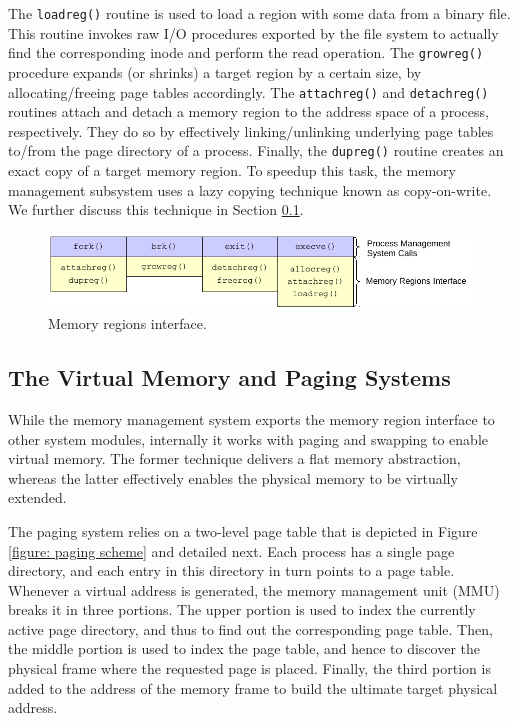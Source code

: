 \documentclass[10pt,a4paper]{article}
\begin{document}
The \texttt{loadreg()} routine is used to load a region with some data from a binary file. This routine invokes raw I/O procedures exported by the file system to actually find the corresponding inode and perform the read operation. The \texttt{growreg()} procedure expands (or shrinks) a target region by a certain size, by allocating/freeing page tables accordingly. The \texttt{attachreg()} and \texttt{detachreg()} routines attach and detach a memory region to the address space of a process, respectively. They do so by effectively linking/unlinking underlying page tables to/from the page directory of a process. Finally, the \texttt{dupreg()} routine creates an exact copy of a target memory region. To speedup this task, the memory management subsystem uses a lazy copying technique known as copy-on-write. We further discuss this technique in Section \ref{subsection: the virtual memory and paging systems}.

\begin{figure}[!t]
	\centering
	\includegraphics[scale=0.8]{img/memory-regions-interface}
	\caption{Memory regions interface.}
	\label{figure: memory regions interface}
\end{figure}

\subsection{The Virtual Memory and Paging Systems}
\label{subsection: the virtual memory and paging systems}

While the memory management system exports the memory region interface to other system modules, internally it works with paging and swapping to enable virtual memory. The former technique delivers a flat memory abstraction, whereas the latter effectively enables the physical memory to be virtually extended.

The paging system relies on a two-level page table that is depicted in Figure \ref{figure: paging scheme} and detailed next. Each process has a single page directory, and each entry in this directory in turn points to a page table. Whenever a virtual address is generated, the memory management unit (MMU) breaks it in three portions. The upper portion is used to index the currently active page directory, and thus to find out the corresponding page table. Then, the middle portion is used to index the page table, and hence to discover the physical frame where the requested page is placed. Finally, the third portion is added to the address of the memory frame to build the ultimate target physical address.
\end{document}
